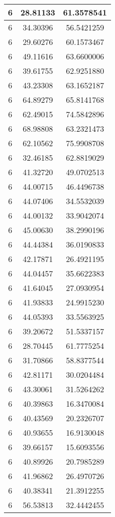 \documentclass[
]{book}
\begin{document}
\begin{tabular}{c|c|c}
\hline
6 & 28.81133 & 61.3578541\\
\hline
6 & 34.30396 & 56.5421259\\
\hline
6 & 29.60276 & 60.1573467\\
\hline
6 & 49.11616 & 63.6600006\\
\hline
6 & 39.61755 & 62.9251880\\
\hline
6 & 43.23308 & 63.1652187\\
\hline
6 & 64.89279 & 65.8141768\\
\hline
6 & 62.49015 & 74.5842896\\
\hline
6 & 68.98808 & 63.2321473\\
\hline
6 & 62.10562 & 75.9908708\\
\hline
6 & 32.46185 & 62.8819029\\
\hline
6 & 41.32720 & 49.0702513\\
\hline
6 & 44.00715 & 46.4496738\\
\hline
6 & 44.07406 & 34.5532039\\
\hline
6 & 44.00132 & 33.9042074\\
\hline
6 & 45.00630 & 38.2990196\\
\hline
6 & 44.44384 & 36.0190833\\
\hline
6 & 42.17871 & 26.4921195\\
\hline
6 & 44.04457 & 35.6622383\\
\hline
6 & 41.64045 & 27.0930954\\
\hline
6 & 41.93833 & 24.9915230\\
\hline
6 & 44.05393 & 33.5563925\\
\hline
6 & 39.20672 & 51.5337157\\
\hline
6 & 28.70445 & 61.7775254\\
\hline
6 & 31.70866 & 58.8377544\\
\hline
6 & 42.81171 & 30.0204484\\
\hline
6 & 43.30061 & 31.5264262\\
\hline
6 & 40.39863 & 16.3470084\\
\hline
6 & 40.43569 & 20.2326707\\
\hline
6 & 40.93655 & 16.9130048\\
\hline
6 & 39.66157 & 15.6093556\\
\hline
6 & 40.89926 & 20.7985289\\
\hline
6 & 41.96862 & 26.4970726\\
\hline
6 & 40.38341 & 21.3912255\\
\hline
6 & 56.53813 & 32.4442455\\

\end{tabular}
\end{document}
